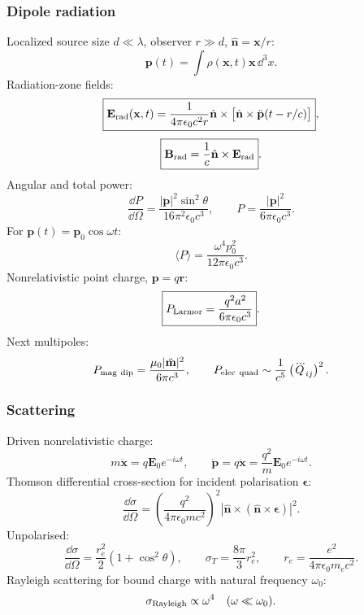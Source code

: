\subsubsection*{Dipole radiation}
Localized source size $d\ll\lambda$, observer $r\gg d$, $\hat{\mathbf n}=\mathbf x/r$:
\[
\mathbf p(t)=\int\rho(\mathbf x,t)\mathbf x\,\dd^3x.
\]
Radiation-zone fields:
\[
\boxed{\mathbf E_{\rm rad}(\mathbf x,t)=\frac{1}{4\pi\epsilon_0c^2r}
\hat{\mathbf n}\times\big[\hat{\mathbf n}\times\ddot{\mathbf p}(t-r/c)\big]},
\]
\[
\boxed{\mathbf B_{\rm rad}=\frac{1}{c}\hat{\mathbf n}\times\mathbf E_{\rm rad}}.
\]
Angular and total power:
\[
\frac{\dd P}{\dd\Omega}=
\frac{|\ddot{\mathbf p}|^2\sin^2\theta}{16\pi^2\epsilon_0c^3},\qquad
\boxed{P=\frac{|\ddot{\mathbf p}|^2}{6\pi\epsilon_0c^3}}.
\]
For $\mathbf p(t)=\mathbf p_0\cos\omega t$:
\[
\langle P\rangle=\frac{\omega^4p_0^2}{12\pi\epsilon_0c^3}.
\]
Nonrelativistic point charge, $\mathbf p=q\mathbf r$:
\[
\boxed{P_{\rm Larmor}=\frac{q^2a^2}{6\pi\epsilon_0c^3}}.
\]
Next multipoles:
\[
P_{\rm mag\ dip}=\frac{\mu_0|\ddot{\mathbf m}|^2}{6\pi c^3},\qquad
P_{\rm elec\ quad}\sim \frac{1}{c^5}\left(\dddot Q_{ij}\right)^2.
\]

\subsubsection*{Scattering}
Driven nonrelativistic charge:
\[
m\ddot{\mathbf x}=q\mathbf E_0e^{-i\omega t},\qquad
\ddot{\mathbf p}=q\ddot{\mathbf x}=\frac{q^2}{m}\mathbf E_0e^{-i\omega t}.
\]
Thomson differential cross-section for incident polarisation $\boldsymbol\epsilon$:
\[
\boxed{\frac{\dd\sigma}{\dd\Omega}=
\left(\frac{q^2}{4\pi\epsilon_0mc^2}\right)^2
|\hat{\mathbf n}\times(\hat{\mathbf n}\times\boldsymbol\epsilon)|^2}.
\]
Unpolarised:
\[
\frac{\dd\sigma}{\dd\Omega}=\frac{r_e^2}{2}(1+\cos^2\theta),\qquad
\sigma_T=\frac{8\pi}{3}r_e^2,\qquad
r_e=\frac{e^2}{4\pi\epsilon_0m_ec^2}.
\]
Rayleigh scattering for bound charge with natural frequency $\omega_0$:
\[
\sigma_{\rm Rayleigh}\propto\omega^4\quad(\omega\ll\omega_0).
\]

